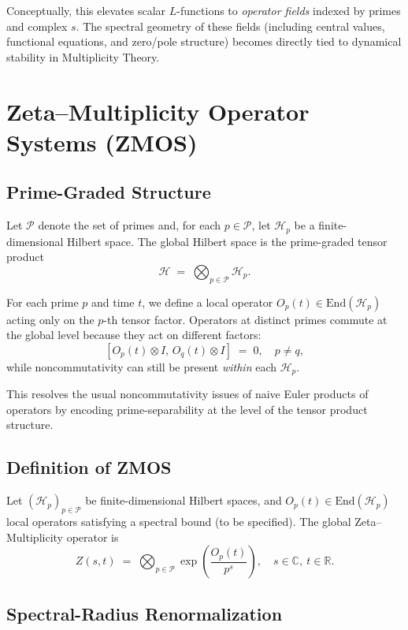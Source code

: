 \documentclass[11pt]{article}
\begin{document}
Conceptually, this elevates scalar $L$-functions to \emph{operator
fields} indexed by primes and complex $s$. The spectral geometry of
these fields (including central values, functional equations, and
zero/pole structure) becomes directly tied to dynamical stability in
Multiplicity Theory.

\section{Zeta--Multiplicity Operator Systems (ZMOS)}

\subsection{Prime-Graded Structure}

Let $\mathcal{P}$ denote the set of primes and, for each
$p \in \mathcal{P}$, let $\mathcal{H}_p$ be a finite-dimensional
Hilbert space. The global Hilbert space is the prime-graded tensor
product
\[
  \mathcal{H} \;=\; \bigotimes_{p \in \mathcal{P}} \mathcal{H}_p.
\]

For each prime $p$ and time $t$, we define a local operator
$O_p(t) \in \mathrm{End}(\mathcal{H}_p)$ acting only on the $p$-th
tensor factor. Operators at distinct primes commute at the global
level because they act on different factors:
\[
  [O_p(t) \otimes I,\, O_q(t) \otimes I] \;=\; 0, \quad p \neq q,
\]
while noncommutativity can still be present \emph{within} each
$\mathcal{H}_p$.

This resolves the usual noncommutativity issues of naive Euler products
of operators by encoding prime-separability at the level of the tensor
product structure.

\subsection{Definition of ZMOS}

\begin{definition}
Let $(\mathcal{H}_p)_{p\in\mathcal{P}}$ be finite-dimensional Hilbert
spaces, and $O_p(t) \in \mathrm{End}(\mathcal{H}_p)$ local operators
satisfying a spectral bound (to be specified). The global Zeta--Multiplicity
operator is
\[
  Z(s,t) \;=\; \bigotimes_{p \in \mathcal{P}}
    \exp\!\left( \frac{O_p(t)}{p^s} \right),
  \quad s \in \mathbb{C},\ t \in \mathbb{R}.
\]
\end{definition}

\subsection{Spectral-Radius Renormalization}
\end{document}
